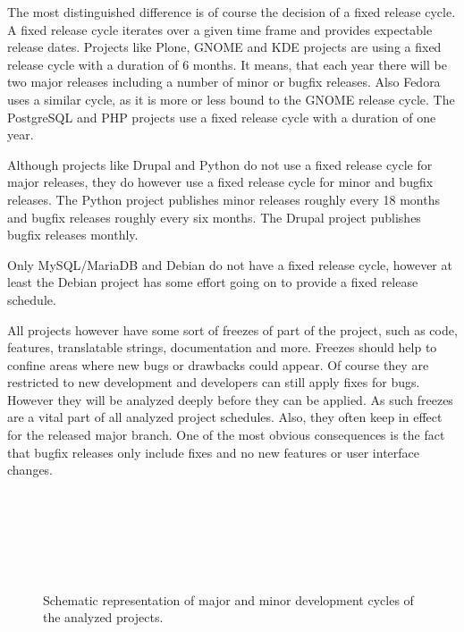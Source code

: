 The most distinguished difference is of course the decision of a fixed release
cycle. A fixed release cycle iterates over a given time frame and provides
expectable release dates. Projects like Plone, GNOME and KDE projects are using
a fixed release cycle with a duration of 6 months. It means, that each year
there will be two major releases including a number of minor or bugfix
releases. Also Fedora uses a similar cycle, as it is more or less bound to the
GNOME release cycle. The PostgreSQL and PHP projects use a fixed release cycle
with a duration of one year.

Although projects like Drupal and Python do not use a fixed release cycle for
major releases, they do however use a fixed release cycle for minor and bugfix
releases. The Python project publishes minor releases roughly every 18 months
and bugfix releases roughly every six months. The Drupal project publishes
bugfix releases monthly.

Only MySQL/MariaDB and Debian do not have a fixed release cycle, however at
least the Debian project has some effort going on to provide a fixed release
schedule.

All projects however have some sort of freezes of part of the project, such as
code, features, translatable strings, documentation and more. Freezes should
help to confine areas where new bugs or drawbacks could appear. Of course they
are restricted to new development and developers can still apply fixes for
bugs. However they will be analyzed deeply before they can be applied. As such
freezes are a vital part of all analyzed project schedules. Also, they often
keep in effect for the released major branch. One of the most obvious
consequences is the fact that bugfix releases only include fixes and no new
features or user interface changes.

\begin{figure}[htbp]
  \centering
   \qquad
   \\

   \qquad
   \\

   \qquad
   \\

   \qquad
   \\

   \qquad
   \\
  \caption{Schematic representation of major and minor development cycles of
  the analyzed projects.}
\end{figure}

